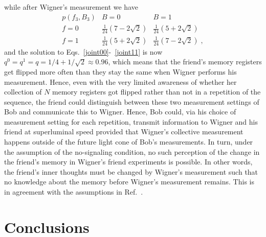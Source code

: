 \documentclass[a4paper,twocolumn,11pt,accepted=2017-05-09,dvipsnames]{quantumarticle}
\numberwithin{equation}{section}
\begin{document}
while after Wigner's measurement we have
\begin{equation*}
\renewcommand{\arraystretch}{1.25}
  \begin{array}{c|c|c}
  p(f_3,B_3)  & B=0 & B=1 \\  [0.25em]  \hline
  f= 0 & \frac{1}{24} \left(7-2\sqrt{2}\right)
 & \frac{1}{24} \left(5+2\sqrt{2}\right) \\[0.25em]
   f= 1 &  \frac{1}{24} \left(5+2\sqrt{2}\right)& \frac{1}{24} \left(7-2\sqrt{2}\right) \;,
  \end{array}
\end{equation*}
and the solution to Eqs.~\eqref{joint00}-~\eqref{joint11} is now $q^0=q^1=q=1/4+ 1/\sqrt{2}\approx 0.96$, which means that the friend's memory registers get flipped more often than they stay the same when Wigner performs his measurement. Hence, even with the very limited awareness of whether her collection of $N$ memory registers got flipped rather than not in a repetition of the sequence, the friend could distinguish between these two measurement settings of Bob and communicate this to Wigner. Hence, Bob could, via his choice of measurement setting for each repetition, transmit information to Wigner and his friend at superluminal speed provided that Wigner's collective measurement happens outside of the future light cone of Bob's measurements. In turn, under the assumption of the no-signaling condition, no such perception of the change in the friend's memory in Wigner's friend experiments is possible. In other words, the friend's inner thoughts must be changed by Wigner's measurement such that no knowledge about the memory before Wigner's measurement remains. This is in agreement with the assumptions in Ref.~\cite{wiseman2023thoughtful}. 


\section{Conclusions}
\label{Conclusions}
\end{document}
